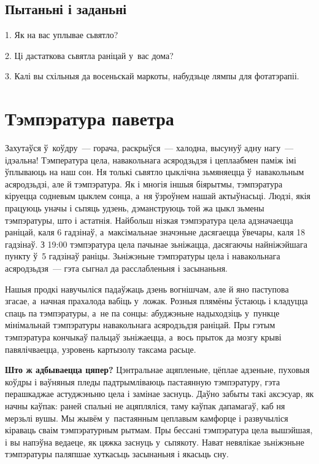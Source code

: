 \subsection*{Пытаньні і заданьні}

1. Як на вас уплывае сьвятло?

2. Ці дастаткова сьвятла раніцай у~вас дома?

3. Калі вы схільныя да восеньскай маркоты, набудзьце лямпы для фотатэрапіі.


\section{Тэмпэратура паветра}

Захутаўся ў~коўдру~--- горача, раскрыўся~--- халодна, высунуў адну нагу~--- ідэальна! Тэмпература цела, навакольнага асяродзьдзя і цеплаабмен паміж імі ўплываюць на наш сон. Ня толькі сьвятло цыклічна зьмяняецца ў~навакольным асяродзьдзі, але й тэмпэратура. Як і многія іншыя біярытмы, тэмпэратура кіруецца содневым цыклем сонца, а~ня ўзроўнем нашай актыўнасьці. Людзі, якія працуюць уначы і сьпяць удзень, дэманструюць той жа цыкл зьмены тэмпэратуры, што і астатнія. Найбольш нізкая тэмпэратура цела адзначаецца раніцай, каля 6 гадзінаў, а~максімальнае значэньне дасягаецца ўвечары, каля 18 гадзінаў. З 19:00 тэмпэратура цела пачынае зьніжацца, дасягаючы найніжэйшага пункту ў~5 гадзінаў раніцы. Зьніжэньне тэмпэратуры цела і навакольнага асяродзьдзя~--- гэта сыгнал да расслабленьня і засынаньня.

Нашыя продкі навучыліся падаўжаць дзень вогнішчам, але й яно паступова згасае, а~начная прахалода вабіць у~ложак. Розныя плямёны ўстаюць і кладуцца спаць па тэмпэратуры, а~не па сонцы: абуджэньне надыходзіць у~пункце мінімальнай тэмпэратуры навакольнага асяродзьдзя раніцай. Пры гэтым тэмпэратура кончыкаў пальцаў зьніжаецца, а~вось прыток да мозгу крыві павялічваецца, узровень картызолу таксама расьце.

\textbf{Што ж адбываецца цяпер?} Цэнтральнае ацяпленьне, цёплае адзеньне, пуховыя коўдры і ваўняныя пледы падтрымліваюць пастаянную тэмпэратуру, гэта перашкаджае астуджэньню цела і замінае заснуць. Даўно забыты такі аксэсуар, як начны каўпак: раней спальні не ацяпляліся, таму каўпак дапамагаў, каб ня мерзьлі вушы. Мы жывём у~пастаянным цеплавым камфорце і развучыліся кіраваць сваім тэмпэратурным рытмам. Пры бессані тэмпэратура цела вышэйшая, і вы напэўна ведаеце, як цяжка заснуць у~сьпякоту. Нават невялікае зьніжэньне тэмпэратуры паляпшае хуткасьць засынаньня і якасьць сну. 

